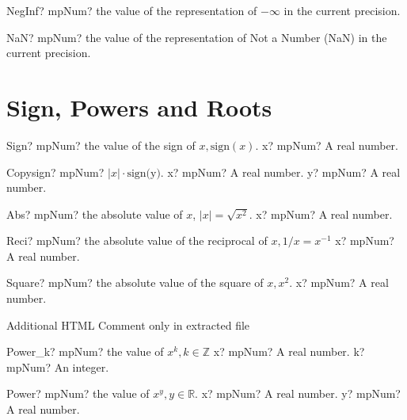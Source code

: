 \documentclass[12pt,a4paper,openany]{book}
\begin{document}
\begin{mpFunctionsExtract}
\mpFunctionZero
{NegInf? mpNum? the value of the representation of  $-\infty$ in the current precision.}
\end{mpFunctionsExtract}

\begin{mpFunctionsExtract}
\mpFunctionZero
{NaN? mpNum? the value of the representation of Not a Number (NaN) in the current precision.}
\end{mpFunctionsExtract}

\section{Sign, Powers and Roots}

\begin{mpFunctionsExtract}
\mpFunctionOne
{Sign? mpNum? the value of the sign of $x, \text{sign}(x)$.}
{x? mpNum? A real number.}
\end{mpFunctionsExtract}

\begin{mpFunctionsExtract}
\mpFunctionTwo
{Copysign? mpNum? $|x|\cdot \text{sign(y)}$.}
{x? mpNum? A real number.}
{y? mpNum? A real number.}
\end{mpFunctionsExtract}

\begin{mpFunctionsExtract}
\mpFunctionOne
{Abs? mpNum? the absolute value of $x$, $|x| = \sqrt{x^2}$.}
{x? mpNum? A real number.}
\end{mpFunctionsExtract}

\begin{mpFunctionsExtract}
\mpFunctionOne
{Reci? mpNum? the absolute value of the reciprocal of $x,  1/x = x^{-1}$}
{x? mpNum? A real number.}
\end{mpFunctionsExtract}

\begin{mpFunctionsExtract}
\mpFunctionOne
{Square? mpNum? the absolute value of the square of $x,  x^2$.}
{x? mpNum? A real number.}
\end{mpFunctionsExtract}
Additional HTML Comment only in extracted file

\begin{mpFunctionsExtract}
\mpFunctionTwo
{Power\_k? mpNum? the value of $x^k, k \in  \mathbb{Z}$}
{x? mpNum? A real number.}
{k? mpNum? An integer.}
\end{mpFunctionsExtract}

\begin{mpFunctionsExtract}
\mpFunctionTwo
{Power? mpNum? the value of $x^y, y \in  \mathbb{R}$.}
{x? mpNum? A real number.}
{y? mpNum? A real number.}
\end{mpFunctionsExtract}
\end{document}
